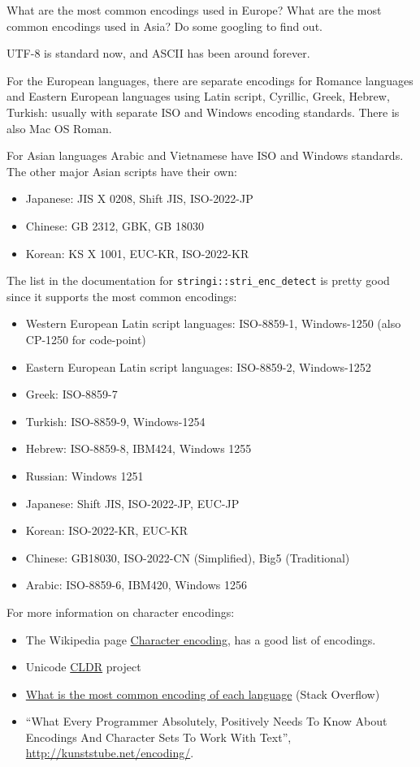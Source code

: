 \documentclass[]{book}
\providecommand{\tightlist}{%
  \setlength{\itemsep}{0pt}\setlength{\parskip}{0pt}}
\theoremstyle{definition}
\theoremstyle{definition}
\theoremstyle{definition}
\theoremstyle{remark}
\begin{document}
What are the most common encodings used in Europe? What are the most
common encodings used in Asia? Do some googling to find out.

UTF-8 is standard now, and ASCII has been around forever.

For the European languages, there are separate encodings for Romance
languages and Eastern European languages using Latin script, Cyrillic,
Greek, Hebrew, Turkish: usually with separate ISO and Windows encoding
standards. There is also Mac OS Roman.

For Asian languages Arabic and Vietnamese have ISO and Windows
standards. The other major Asian scripts have their own:

\begin{itemize}
\tightlist
\item
  Japanese: JIS X 0208, Shift JIS, ISO-2022-JP
\item
  Chinese: GB 2312, GBK, GB 18030
\item
  Korean: KS X 1001, EUC-KR, ISO-2022-KR
\end{itemize}

The list in the documentation for \texttt{stringi::stri\_enc\_detect} is
pretty good since it supports the most common encodings:

\begin{itemize}
\tightlist
\item
  Western European Latin script languages: ISO-8859-1, Windows-1250
  (also CP-1250 for code-point)
\item
  Eastern European Latin script languages: ISO-8859-2, Windows-1252
\item
  Greek: ISO-8859-7
\item
  Turkish: ISO-8859-9, Windows-1254
\item
  Hebrew: ISO-8859-8, IBM424, Windows 1255
\item
  Russian: Windows 1251
\item
  Japanese: Shift JIS, ISO-2022-JP, EUC-JP
\item
  Korean: ISO-2022-KR, EUC-KR
\item
  Chinese: GB18030, ISO-2022-CN (Simplified), Big5 (Traditional)
\item
  Arabic: ISO-8859-6, IBM420, Windows 1256
\end{itemize}

For more information on character encodings:

\begin{itemize}
\tightlist
\item
  The Wikipedia page
  \href{https://en.wikipedia.org/wiki/Character_encoding}{Character
  encoding}, has a good list of encodings.
\item
  Unicode \href{http://cldr.unicode.org/}{CLDR} project
\item
  \href{http://stackoverflow.com/questions/8509339/what-is-the-most-common-encoding-of-each-language}{What
  is the most common encoding of each language} (Stack Overflow)
\item
  ``What Every Programmer Absolutely, Positively Needs To Know About
  Encodings And Character Sets To Work With Text'',
  \url{http://kunststube.net/encoding/}.
\end{itemize}
\end{document}
